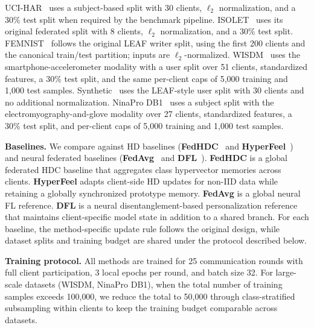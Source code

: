 \documentclass[lettersize,journal]{IEEEtran}
\newcommand{\rev}[1]{#1}
\begin{document}
UCI-HAR~\cite{human_activity_recognition_using_smartphones_240} uses a subject-based split with 30 clients, $\ell_2$ normalization, and a 30\% test split when required by the benchmark pipeline.
ISOLET~\cite{isolet_54} uses its original federated split with 8 clients, $\ell_2$ normalization, and a 30\% test split.
FEMNIST~\cite{caldas2019leafbenchmarkfederatedsettings} follows the original LEAF writer split, using the first 200 clients and the canonical train/test partition; inputs are $\ell_2$-normalized.
WISDM~\cite{wisdm_smartphone_and_smartwatch_activity_and_biometrics_dataset__507} uses the smartphone-accelerometer modality with a user split over 51 clients, standardized features, a 30\% test split, and the same per-client caps of 5{,}000 training and 1{,}000 test samples.
Synthetic~\cite{caldas2019leafbenchmarkfederatedsettings} uses the LEAF-style user split with 30 clients and no additional normalization.
NinaPro DB1~\cite{Ninapro2015} uses a subject split with the electromyography-and-glove modality over 27 clients, standardized features, a 30\% test split, and per-client caps of 5{,}000 training and 1{,}000 test samples.

\noindent\textbf{Baselines.}
We compare against HD baselines (\textbf{FedHDC}~\cite{ergun2023federatedhyperdimensionalcomputing} and \textbf{HyperFeel}~\cite{li2024hyperfeel}) and neural federated baselines (\textbf{FedAvg}~\cite{mcmahan2023communicationefficientlearningdeepnetworks} %
and \textbf{DFL}~\cite{luo2022disentangledfederatedlearningtackling}).
\rev{\textbf{FedHDC} is a global federated HDC baseline that aggregates class hypervector memories across clients.}
\rev{\textbf{HyperFeel} adapts client-side HD updates for non-IID data while retaining a globally synchronized prototype memory.}
\rev{\textbf{FedAvg} is a global neural FL reference.}
\rev{\textbf{DFL} is a neural disentanglement-based personalization reference that maintains client-specific model state in addition to a shared branch.}
\rev{For each baseline, the method-specific update rule follows the original design, while dataset splits and training budget are shared under the protocol described below.}

\noindent\textbf{Training protocol.}
All methods are trained for 25 communication rounds with full client participation, 3 local epochs per round, and batch size 32.
For large-scale datasets (WISDM, NinaPro DB1), when the total number of training samples exceeds 100{,}000, we reduce the total to 50{,}000 through class-stratified subsampling within clients to keep the training budget comparable across datasets.
\end{document}
